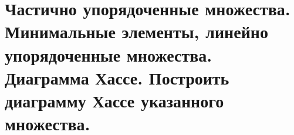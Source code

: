 \section{Частично упорядоченные множества. Минимальные элементы, линейно упорядоченные 
множества.  Диаграмма Хассе. Построить диаграмму Хассе указанного множества.}